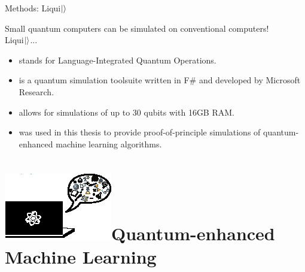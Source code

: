 \documentclass[10pt]{beamer}
\begin{document}
{
\begin{frame}[fragile]{Methods: Liqui$\ket{}$}

Small quantum computers can be simulated on conventional computers!\\
\vspace{0.5cm}
Liqui$\ket{}$...
\begin{itemize}
\item stands for Language-Integrated Quantum Operations. 
\item is a quantum simulation toolsuite written in F\# and developed by Microsoft Research.
\item allows for simulations of up to 30 qubits with 16GB RAM.
\item was used in this thesis to provide proof-of-principle simulations of quantum-enhanced machine learning algorithms.

\end{itemize}

\end{frame}
}

\section*{\protect\includegraphics[scale=2.4]{Vectors/laptop_qml.eps}\newline Quantum-enhanced Machine Learning}
\end{document}

